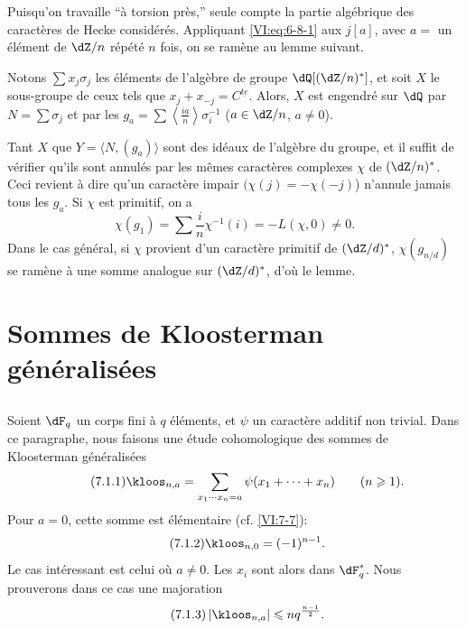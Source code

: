 Puisqu'on travaille ``à torsion près,'' seule compte la partie algébrique 
des caractères de Hecke considérés. Appliquant \eqref{VI:eq:6-8-1} aux 
$j[a]$, avec $a=$ un élément de $\dZ/n$ répété $n$ fois, on se 
ramène au lemme suivant.





\begin{lemma_}\label{VI:6-12}
Notons $\sum x_j \sigma_j$ les éléments de l'algèbre de groupe 
$\dQ[(\dZ/n)^\ast]$, et soit $X$ le sous-groupe de ceux tels que 
$x_j+x_{-j}=C^{\underline{t e}}$. Alors, $X$ est engendré sur $\dQ$ par 
$N=\sum \sigma_j$ et par les 
$g_a=\sum \left\langle \frac{i a}{n}\right\rangle \sigma_i^{-1}$ 
($a\in \dZ/n$, $a\ne 0$). 
\end{lemma_}

Tant $X$ que $Y=\langle N,(g_a)\rangle$ sont des idéaux de l'algèbre du 
groupe, et il suffit de vérifier qu'ils sont annulés par les mêmes 
caractères complexes $\chi$ de $(\dZ/n)^\ast$. Ceci revient à dire qu'un 
caractère impair $(\chi(j)=-\chi(-j)$) n'annule jamais tous les $g_a$. Si 
$\chi$ est primitif, on a 
\[
  \chi(g_1) = \sum \frac i n \chi^{-1}(i) = -L(\chi,0)\ne 0 \text{.} 
\]
Dans le cas général, si $\chi$ provient d'un caractère primitif de 
$(\dZ/d)^\ast$, $\chi(g_{n/d})$ se ramène à une somme analogue sur 
$(\dZ/d)^\ast$, d'où le lemme. 










\section{Sommes de Kloosterman généralisées}\label{VI:7}





\subsection{}\label{VI:7-1}

Soient $\dF_q$ un corps fini à $q$ éléments, et $\psi$ un caractère 
additif non trivial. Dans ce paragraphe, nous faisons une étude cohomologique 
des sommes de Kloosterman généralisées 
\begin{equation*}\tag{7.1.1}\label{VI:eq:7-1-1}
  \kloos_{n,a} = \sum_{x_1\dotsm x_n = a} \psi(x_1+\cdots + x_n) \qquad (n\geqslant 1) \text{.} 
\end{equation*}
Pour $a=0$, cette somme est élémentaire (cf. \ref{VI:7-7}): 
\begin{equation*}\tag{7.1.2}\label{VI:eq:7-1-2}
  \kloos_{n,0} = (-1)^{n-1} \text{.} 
\end{equation*}
Le cas intéressant est celui où $a\ne 0$. Les $x_i$ sont alors dans 
$\dF_q^\ast$. Nous prouverons dans ce cas une majoration 
\begin{equation*}\tag{7.1.3}\label{VI:eq:7-1-3}
  \left|\kloos_{n,a}\right| \leqslant n q^{\frac{n-1}{2}} \text{.} 
\end{equation*}

